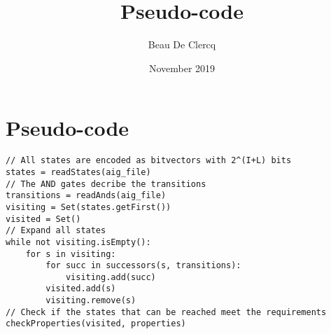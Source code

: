 \documentclass[12pt]{article}
\title{Pseudo-code}
\author{Beau De Clercq}
\date{November 2019}
\begin{document}
\maketitle{}



\section{Pseudo-code}
\begin{lstlisting}[language=pseudo]
// All states are encoded as bitvectors with 2^(I+L) bits
states = readStates(aig_file) 
// The AND gates decribe the transitions
transitions = readAnds(aig_file) 
visiting = Set(states.getFirst())
visited = Set()
// Expand all states
while not visiting.isEmpty():
	for s in visiting:
		for succ in successors(s, transitions):
			visiting.add(succ)
		visited.add(s)
		visiting.remove(s)
// Check if the states that can be reached meet the requirements
checkProperties(visited, properties)

\end{lstlisting}
\end{document}
